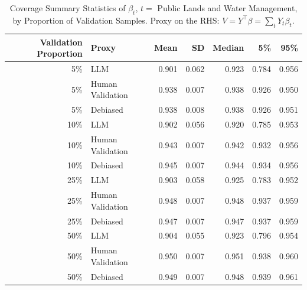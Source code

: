\begin{table}

\caption{\label{tab:unnamed-chunk-1}Coverage Summary Statistics of $\beta_{t}$, $t=$ Public Lands and Water Management, by Proportion of Validation Samples.
      Proxy on the RHS: $V = Y^\top \beta = \sum_{t} Y_t \beta_t$.}
\centering
\begin{tabular}[t]{rlrrrrr}
\toprule
Validation Proportion & Proxy & Mean & SD & Median & 5\% & 95\%\\
\midrule
5\% & LLM & 0.901 & 0.062 & 0.923 & 0.784 & 0.956\\
5\% & Human Validation & 0.938 & 0.007 & 0.938 & 0.926 & 0.950\\
5\% & Debiased & 0.938 & 0.008 & 0.938 & 0.926 & 0.951\\
10\% & LLM & 0.902 & 0.056 & 0.920 & 0.785 & 0.953\\
10\% & Human Validation & 0.943 & 0.007 & 0.942 & 0.932 & 0.956\\
10\% & Debiased & 0.945 & 0.007 & 0.944 & 0.934 & 0.956\\
25\% & LLM & 0.903 & 0.058 & 0.925 & 0.783 & 0.952\\
25\% & Human Validation & 0.948 & 0.007 & 0.948 & 0.937 & 0.959\\
25\% & Debiased & 0.947 & 0.007 & 0.947 & 0.937 & 0.959\\
50\% & LLM & 0.904 & 0.055 & 0.923 & 0.796 & 0.954\\
50\% & Human Validation & 0.950 & 0.007 & 0.951 & 0.938 & 0.960\\
50\% & Debiased & 0.949 & 0.007 & 0.948 & 0.939 & 0.961\\
\bottomrule
\end{tabular}
\end{table}
